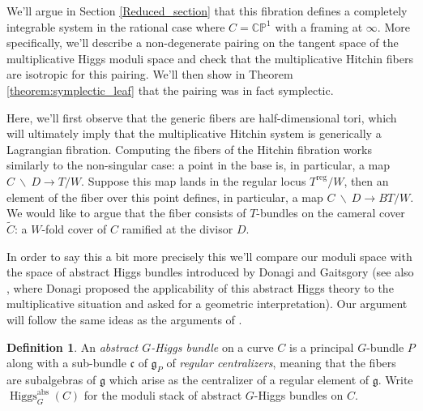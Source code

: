 \documentclass[11pt, oneside, reqno]{amsart}
\theoremstyle{definition} \newtheorem{definition}{Definition}[section]
\theoremstyle{definition} \newtheorem{remark}[definition]{Remark}
\theoremstyle{definition} \newtheorem{remarks}[definition]{Remarks}
\theoremstyle{definition} \newtheorem{question}[definition]{Question}
\theoremstyle{definition} \newtheorem*{note}{Note}
\theoremstyle{definition} \newtheorem{example}[definition]{Example}
\theoremstyle{definition} \newtheorem{examples}[definition]{Examples}
\renewcommand{\gg}{\mathfrak{g}}
\newcommand{\bb}[1]{\mathbb{#1}}
\newcommand{\mr}[1]{\mathrm{#1}}
\newcommand{\mf}[1]{\mathfrak{#1}}
\newcommand{\wt}[1]{\widetilde{#1}}
\newcommand{\bs}{\ \backslash \ }
\DeclareMathOperator{\higgs}{Higgs}
\begin{document}
We'll argue in Section \ref{Reduced_section} that this fibration defines a completely integrable system in the rational case where $C = \bb{CP}^1$ with a framing at $\infty$. More specifically, we'll describe a non-degenerate pairing on the tangent space of the multiplicative Higgs moduli space and check that the multiplicative Hitchin fibers are isotropic for this pairing.  We'll then show in Theorem \ref{theorem:symplectic_leaf} that the pairing was in fact symplectic.

Here, we'll first observe that the generic fibers are half-dimensional tori, which will ultimately imply that the multiplicative Hitchin system is generically a Lagrangian fibration.  Computing the fibers of the Hitchin fibration works similarly to the non-singular case: a point in the base is, in particular, a map $C \bs D \to T/W$.  Suppose this map lands in the regular locus $T^{\mr{reg}}/W$, then an element of the fiber over this point defines, in particular, a map $C \bs D \to BT/W$.  We would like to argue that the fiber consists of $T$-bundles on the cameral cover $\wt C$: a $W$-fold cover of $C$ ramified at the divisor $D$.

In order to say this a bit more precisely this we'll compare our moduli space with the space of abstract Higgs bundles introduced by Donagi and Gaitsgory \cite{DonagiGaitsgory} (see also \cite{DonagiLectures}, where Donagi proposed the applicability of this abstract Higgs theory to the multiplicative situation and asked for a geometric interpretation).  Our argument will follow the same ideas as the arguments of \cite[Section 6]{HurtubiseMarkman}.

\begin{definition}
An \emph{abstract $G$-Higgs bundle} on a curve $C$ is a principal $G$-bundle $P$ along with a sub-bundle $\mf c$ of $\gg_P$ of \emph{regular centralizers}, meaning that the fibers are subalgebras of $\gg$ which arise as the centralizer of a regular element of $\gg$.  Write $\higgs_G^{\mr{abs}}(C)$ for the moduli stack of abstract $G$-Higgs bundles on $C$.
\end{definition}
\end{document}
